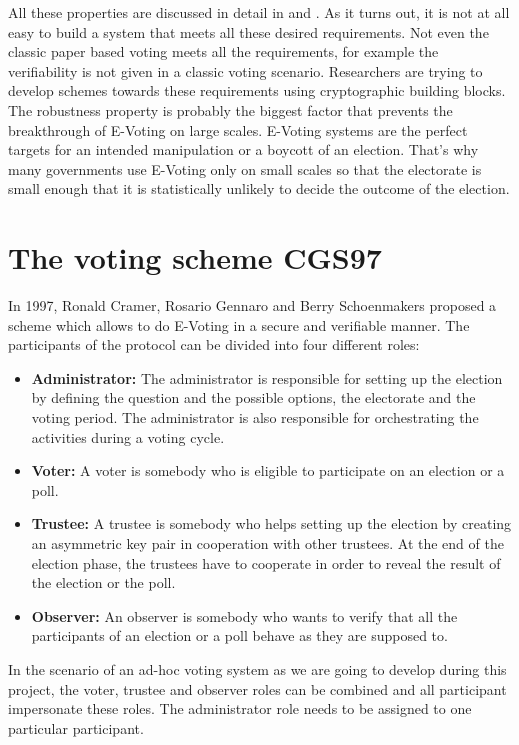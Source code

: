\documentclass[numbers=noenddot, abstract=on, a4paper, headsepline,
footsepline, oneside, draft=off]{scrreprt}
\begin{document}
All these properties are discussed in detail in \cite{HS11} and \cite{Jonker09}.
As it turns out, it is not at all easy to build a system that meets all these
desired requirements. Not even the classic paper based voting meets all the
requirements, for example the verifiability is not given in a classic voting
scenario. Researchers are trying to develop schemes towards these requirements
using cryptographic building blocks. The robustness property is probably the
biggest factor that prevents the breakthrough of E-Voting on large scales.
E-Voting systems are the perfect targets for an intended manipulation or a
boycott of an election. That's why many governments use E-Voting only on small
scales so that the electorate is small enough that it is statistically unlikely
to decide the outcome of the election.

\section{The voting scheme CGS97}
\label{sec:CGS97}
In 1997, Ronald Cramer, Rosario Gennaro and Berry Schoenmakers proposed a scheme
\cite{CGS97} which allows to do E-Voting in a secure and verifiable manner. The participants of
the protocol can be divided into four different roles:
\begin{itemize}
  \item \textbf{Administrator:} The administrator is responsible for setting up
  the election by defining the question and the possible options, the
  electorate and the voting period. The administrator is also responsible for
  orchestrating the activities during a voting cycle.
  \item \textbf{Voter:} A voter is somebody who is eligible to participate on
  an election or a poll. 
  \item \textbf{Trustee:} A trustee is somebody who helps setting up the
  election by creating an asymmetric key pair in cooperation with other
  trustees.
  At the end of the election phase, the trustees have to cooperate in order to
  reveal the result of the election or the poll.
  \item \textbf{Observer:} An observer is somebody who wants to verify that all
  the participants of an election or a poll behave as they are supposed to.
\end{itemize}

In the scenario of an ad-hoc voting system as we are going to develop during
this project, the voter, trustee and observer roles can be combined and all
participant impersonate these roles. The administrator role needs to be assigned
to one particular participant.
\end{document}
